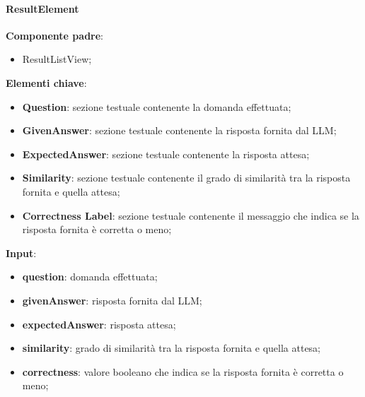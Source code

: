 \paragraph{ResultElement}
\textbf{Componente padre}:
\begin{itemize}
    \item ResultListView;
\end{itemize}
\textbf{Elementi chiave}:
\begin{itemize}
    \item \textbf{Question}: sezione testuale contenente la domanda effettuata;
    \item \textbf{GivenAnswer}: sezione testuale contenente la risposta fornita dal LLM;
    \item \textbf{ExpectedAnswer}: sezione testuale contenente la risposta attesa;
    \item \textbf{Similarity}: sezione testuale contenente il grado di similarità tra la risposta fornita e quella attesa;
    \item \textbf{Correctness Label}: sezione testuale contenente il messaggio che indica se la risposta fornita è corretta o meno;
\end{itemize}
\textbf{Input}:
\begin{itemize}
    \item \textbf{question}: domanda effettuata;
    \item \textbf{givenAnswer}: risposta fornita dal LLM;
    \item \textbf{expectedAnswer}: risposta attesa;
    \item \textbf{similarity}: grado di similarità tra la risposta fornita e quella attesa;
    \item \textbf{correctness}: valore booleano che indica se la risposta fornita è corretta o meno;
\end{itemize}
